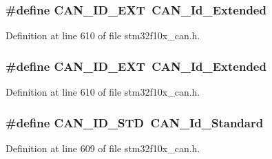 \subsubsection[{\texorpdfstring{C\+A\+N\+\_\+\+I\+D\+\_\+\+E\+XT}{CAN_ID_EXT}}]{\setlength{\rightskip}{0pt plus 5cm}\#define C\+A\+N\+\_\+\+I\+D\+\_\+\+E\+XT~{\bf C\+A\+N\+\_\+\+Id\+\_\+\+Extended}}\hypertarget{group___c_a_n___legacy_ga5f6fdd1dc3d312af1ac30e2eee15d6f0}{}\label{group___c_a_n___legacy_ga5f6fdd1dc3d312af1ac30e2eee15d6f0}


Definition at line 610 of file stm32f10x\+\_\+can.\+h.

\subsubsection[{\texorpdfstring{C\+A\+N\+\_\+\+I\+D\+\_\+\+E\+XT}{CAN_ID_EXT}}]{\setlength{\rightskip}{0pt plus 5cm}\#define C\+A\+N\+\_\+\+I\+D\+\_\+\+E\+XT~{\bf C\+A\+N\+\_\+\+Id\+\_\+\+Extended}}\hypertarget{group___c_a_n___legacy_ga5f6fdd1dc3d312af1ac30e2eee15d6f0}{}\label{group___c_a_n___legacy_ga5f6fdd1dc3d312af1ac30e2eee15d6f0}


Definition at line 610 of file stm32f10x\+\_\+can.\+h.

\subsubsection[{\texorpdfstring{C\+A\+N\+\_\+\+I\+D\+\_\+\+S\+TD}{CAN_ID_STD}}]{\setlength{\rightskip}{0pt plus 5cm}\#define C\+A\+N\+\_\+\+I\+D\+\_\+\+S\+TD~{\bf C\+A\+N\+\_\+\+Id\+\_\+\+Standard}}\hypertarget{group___c_a_n___legacy_ga284ca16658deb9d0c21f4ddc6db14833}{}\label{group___c_a_n___legacy_ga284ca16658deb9d0c21f4ddc6db14833}


Definition at line 609 of file stm32f10x\+\_\+can.\+h.

